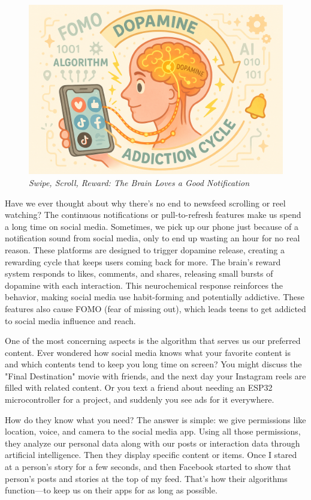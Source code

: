 \documentclass[a4paper,10pt,twocolumn]{memoir}
\begin{document}
\begin{figure}[h!]
  \centering
  \includegraphics[width=0.9\linewidth]{brended.png}
  \caption*{\textit{Swipe, Scroll, Reward: The Brain Loves a Good Notification}}
\end{figure}

Have we ever thought about why there’s no end to newsfeed scrolling or reel watching? The continuous notifications or pull-to-refresh features make us spend a long time on social media. Sometimes, we pick up our phone just because of a notification sound from social media, only to end up wasting an hour for no real reason. These platforms are designed to trigger dopamine release, creating a rewarding cycle that keeps users coming back for more. The brain’s reward system responds to likes, comments, and shares, releasing small bursts of dopamine with each interaction. This neurochemical response reinforces the behavior, making social media use habit-forming and potentially addictive. These features also cause FOMO (fear of missing out), which leads teens to get addicted to social media influence and reach.

One of the most concerning aspects is the algorithm that serves us our preferred content. Ever wondered how social media knows what your favorite content is and which contents tend to keep you long time on screen? You might discuss the "Final Destination" movie with friends, and the next day your Instagram reels are filled with related content. Or you text a friend about needing an ESP32 microcontroller for a project, and suddenly you see ads for it everywhere.

How do they know what you need? The answer is simple: we give permissions like location, voice, and camera to the social media app. Using all those permissions, they analyze our personal data along with our posts or interaction data through artificial intelligence. Then they display specific content or items. Once I stared at a person’s story for a few seconds, and then Facebook started to show that person’s posts and stories at the top of my feed. That’s how their algorithms function—to keep us on their apps for as long as possible.
\end{document}
